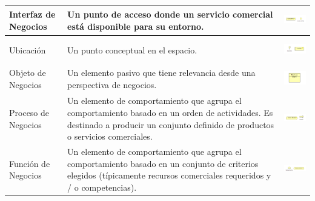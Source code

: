 \begin{table}[H]
\begin{tabular}{| m{3cm} | m{7cm} | m{3.8cm} |}
		Interfaz de Negocios     & Un punto de acceso donde un servicio comercial está disponible para su entorno.                                                                                                     
		&\vspace{1.52mm}\includegraphics[width=40mm,height=10mm]{imgs/conceptos/negocio/Business_Interface.pdf}  \\ \hline
		
		Ubicación                & Un punto conceptual en el espacio.                                                                                     
		&\vspace{1.52mm}\includegraphics[width=40mm, height=10mm]{imgs/conceptos/negocio/Location.pdf}           \\ \hline
		
		Objeto de Negocios       & Un elemento pasivo que tiene relevancia desde una perspectiva de negocios.                                                                                                         
		&\vspace{1.52mm}\includegraphics[width=40mm, height=10mm]{imgs/conceptos/negocio/Business_Object.pdf}   \\ \hline
		
		Proceso de Negocios      & Un elemento de comportamiento que agrupa el comportamiento basado en un orden de actividades. Es destinado a producir un  conjunto definido de productos o servicios comerciales.
		&\vspace{1.52mm} \includegraphics[width=40mm, height=10mm]{imgs/conceptos/negocio/Business_proces.pdf}            \\ \hline
		
		Función de Negocios      & Un elemento de comportamiento que agrupa el comportamiento basado en un conjunto de criterios elegidos (típicamente recursos comerciales requeridos y / o competencias).        &\vspace{1.52mm}\includegraphics[width=40mm, height=10mm]{imgs/conceptos/negocio/Business_function.pdf}            \\ \hline
		

\end{tabular}
\end{table}
